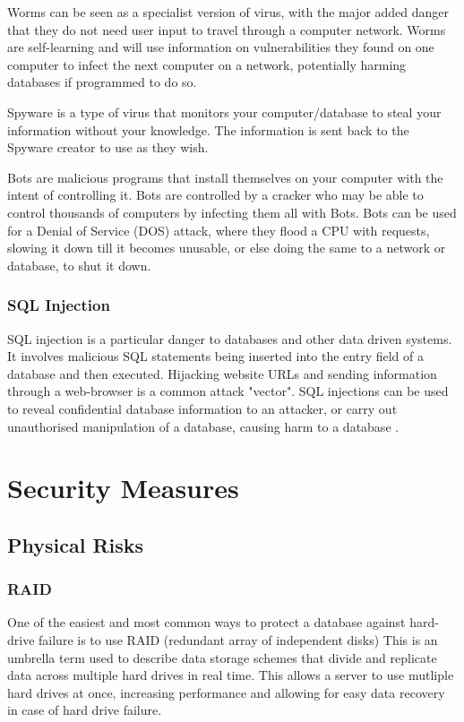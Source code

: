 \documentclass[11pt, twocolumn]{article}
\begin{document}
Worms can be seen as a specialist version of virus, with the major added danger that they do not need user input to travel through a computer network. Worms are self-learning and will use information on vulnerabilities they found on one computer to infect the next computer on a network, potentially harming databases if programmed to do so\cite{Bas}.

Spyware is a type of virus that monitors your computer/database to steal your information without your knowledge.  The information is sent back to the Spyware creator to use as they wish\cite{Bas}.

Bots are malicious programs that install themselves on your computer with the intent of controlling it.  Bots are controlled by a cracker who may be able to control thousands of computers by infecting them all with Bots.  Bots can be used for a Denial of Service (DOS) attack, where they flood a CPU with requests, slowing it down till it becomes unusable, or else doing the same to a network or database, to shut it down\cite{Bas}. 

\subsubsection{SQL Injection}
SQL injection is a particular danger to databases and other data driven systems.  It involves malicious SQL statements being inserted into the entry field of a database and then executed.  Hijacking website URLs and sending information through a web-browser is a common attack "vector".  SQL injections can be used to reveal confidential database information to an attacker, or carry out unauthorised manipulation of a database, causing harm to a database \cite{Bas}.

\section{Security Measures}
\subsection{Physical Risks}

\subsubsection{RAID}

One of the easiest and most common ways to protect a database against hard-drive failure is to use RAID (redundant array of independent disks)\cite{raid} This is an umbrella term used to describe data storage schemes that divide and replicate data across multiple hard drives in real time. This allows a server to use mutliple hard drives at once, increasing performance and allowing for easy data recovery in case of hard drive failure.
\end{document}
